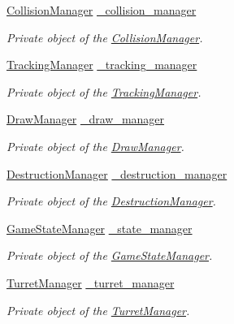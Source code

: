 \begin{DoxyCompactItemize}
\hyperlink{classCollisionManager}{Collision\-Manager} \hyperlink{classGame_a434f5c076c3abc86944fb02e86edc432}{\-\_\-collision\-\_\-manager}
\begin{DoxyCompactList}\small\item\em Private object of the \hyperlink{classCollisionManager}{Collision\-Manager}. \end{DoxyCompactList}\item 
\hyperlink{classTrackingManager}{Tracking\-Manager} \hyperlink{classGame_af8fcc8c3d82a46d37e354de8ddde88c0}{\-\_\-tracking\-\_\-manager}
\begin{DoxyCompactList}\small\item\em Private object of the \hyperlink{classTrackingManager}{Tracking\-Manager}. \end{DoxyCompactList}\item 
\hyperlink{classDrawManager}{Draw\-Manager} \hyperlink{classGame_ad554fb786ee2bf6ebb4d317df563fdd9}{\-\_\-draw\-\_\-manager}
\begin{DoxyCompactList}\small\item\em Private object of the \hyperlink{classDrawManager}{Draw\-Manager}. \end{DoxyCompactList}\item 
\hyperlink{classDestructionManager}{Destruction\-Manager} \hyperlink{classGame_a623e3b207586fd8680e0304e6b6300a0}{\-\_\-destruction\-\_\-manager}
\begin{DoxyCompactList}\small\item\em Private object of the \hyperlink{classDestructionManager}{Destruction\-Manager}. \end{DoxyCompactList}\item 
\hyperlink{classGameStateManager}{Game\-State\-Manager} \hyperlink{classGame_aed3d39ba9be8eb05ab3b18465ae8e982}{\-\_\-state\-\_\-manager}
\begin{DoxyCompactList}\small\item\em Private object of the \hyperlink{classGameStateManager}{Game\-State\-Manager}. \end{DoxyCompactList}\item 
\hyperlink{classTurretManager}{Turret\-Manager} \hyperlink{classGame_ac2f6df412f7efa3eb8750d350dd0261a}{\-\_\-turret\-\_\-manager}
\begin{DoxyCompactList}\small\item\em Private object of the \hyperlink{classTurretManager}{Turret\-Manager}. \end{DoxyCompactList}\item 

\end{DoxyCompactItemize}
